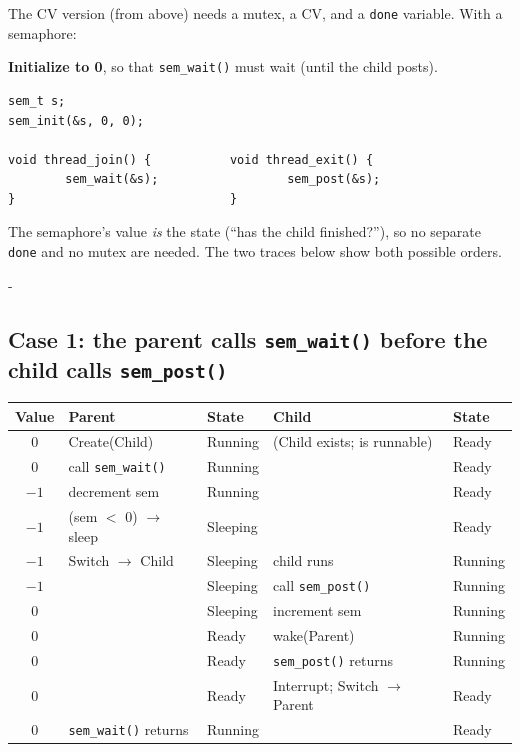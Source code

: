 \documentclass[11pt,a4paper]{article}
\makeatletter
\newcommand{\keepspace}[1]{\par\penalty-100\begingroup
  \setlength{\dimen@}{#1}\dimen@ii\pagegoal\advance\dimen@ii-\pagetotal
  \ifdim\dimen@>\dimen@ii\ifdim\dimen@ii>\z@\vfil\fi\break\fi\endgroup}
\makeatother
\begin{document}
The CV version (from above) needs a mutex, a CV, and a \texttt{done}
variable. With a semaphore:

\begin{quizbox}
\textbf{Initialize to 0}, so that \texttt{sem\_wait()} must wait (until the
child posts).
\end{quizbox}

\begin{lstlisting}
sem_t s;
sem_init(&s, 0, 0);

void thread_join() {           void thread_exit() {
        sem_wait(&s);                  sem_post(&s);
}                              }
\end{lstlisting}

The semaphore's value \emph{is} the state (``has the child finished?''), so
no separate \texttt{done} and no mutex are needed. The two traces below show
both possible orders.

\keepspace{18\baselineskip}
\subsection{Case 1: the parent calls \texttt{sem\_wait()} before the child calls \texttt{sem\_post()}}

\begin{center}
\small
\renewcommand{\arraystretch}{1.08}
\begin{tabular}{@{}cllll@{}}
  \toprule
  \textbf{Value} & \textbf{Parent} & \textbf{State} & \textbf{Child} & \textbf{State} \\
  \midrule
  0  & Create(Child)            & Running  & (Child exists; is runnable) & Ready \\
  0  & call \texttt{sem\_wait()} & Running  & & Ready \\
  \(-1\) & decrement sem        & Running  & & Ready \\
  \(-1\) & (sem \(<\) 0) \(\to\) sleep & Sleeping & & Ready \\
  \(-1\) & Switch \(\to\) Child & Sleeping & child runs & Running \\
  \(-1\) &                      & Sleeping & call \texttt{sem\_post()} & Running \\
  0  &                          & Sleeping & increment sem & Running \\
  0  &                          & Ready    & wake(Parent) & Running \\
  0  &                          & Ready    & \texttt{sem\_post()} returns & Running \\
  0  &                          & Ready    & Interrupt; Switch \(\to\) Parent & Ready \\
  0  & \texttt{sem\_wait()} returns & Running & & Ready \\
  \bottomrule
\end{tabular}
\end{center}
\end{document}
